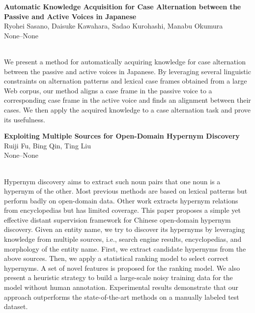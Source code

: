 \documentclass[twoside,makeidx]{book}
\begin{document}
\par\vspace{2em}\noindent%
\begin{minipage}{\linewidth}%
\begin{center}
\textbf{\normalsize Automatic Knowledge Acquisition for Case Alternation between the Passive and Active Voices in Japanese}\\
\normalsize  Ryohei Sasano,  Daisuke Kawahara,  Sadao Kurohashi,  Manabu Okumura\\
{\small None--None}\\
\end{center}
\end{minipage}\\[0.5em]
\nopagebreak%
\noindent%
{\small We present a method for automatically acquiring knowledge for case alternation between the passive and active voices in Japanese. By leveraging several linguistic constraints on alternation patterns and lexical case frames obtained from a large Web corpus, our method aligns a case frame in the passive voice to a corresponding case frame in the active voice and finds an alignment between their cases. We then apply the acquired knowledge to a case alternation task and prove its usefulness.}
\par\vspace{2em}\noindent%
\begin{minipage}{\linewidth}%
\begin{center}
\textbf{\normalsize Exploiting Multiple Sources for Open-Domain Hypernym Discovery}\\
\normalsize  Ruiji Fu,  Bing Qin,  Ting Liu\\
{\small None--None}\\
\end{center}
\end{minipage}\\[0.5em]
\nopagebreak%
\noindent%
{\small Hypernym discovery aims to extract such noun pairs that one noun is a hypernym of the other. Most previous methods are based on lexical patterns but perform badly on open-domain data. Other work extracts hypernym relations from encyclopedias but has limited coverage. This paper proposes a simple yet effective distant supervision framework for Chinese open-domain hypernym discovery. Given an entity name, we try to discover its hypernyms by leveraging knowledge from multiple sources, i.e., search engine results, encyclopedias, and morphology of the entity name. First, we extract candidate hypernyms from the above sources. Then, we apply a statistical ranking model to select correct hypernyms. A set of novel features is proposed for the ranking model. We also present a heuristic strategy to build a large-scale noisy training data for the model without human annotation. Experimental results demonstrate that our approach outperforms the state-of-the-art methods on a manually labeled test dataset.}
\end{document}
